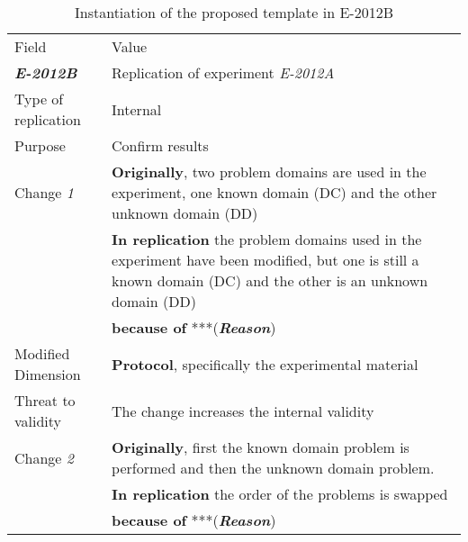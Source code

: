 \begin{table*}[h]
  \caption{Instantiation of the proposed template in E-2012B}
\label{tab:plantEng}
  \centering

\begin{tabularx}{\textwidth}{
  >{\hsize=0.3\hsize}X
  >{\hsize=0.8\hsize}X}
  
    \noalign{\smallskip}\hline\noalign{\smallskip}
  
  Field &  Value  \\ 
  \noalign{\smallskip}\hline\noalign{\smallskip}
  
\textbf {\textit{E-2012B}} &  Replication of experiment \textit{E-2012A }    \\
Type of replication &  Internal   \\  
Purpose  &  Confirm results \\   \hline

    Change \textit{1}   & \textbf{Originally}, two problem domains are used in the experiment, one known domain (DC) and the other unknown domain (DD) \\& \textbf{In replication} the problem domains used in the experiment have been modified, but one is still a known domain (DC) and the other is an unknown domain (DD) \\& \textbf{because of} ***(\textbf{\textit{Reason}})\\
    
    Modified Dimension & 
   \textbf{Protocol}, specifically the experimental material  \\ 
    Threat to validity & The change increases the internal validity \\  \hline
  
    Change \textit{2}   & \textbf{Originally}, first the known domain problem is performed and then the unknown domain problem. \\& \textbf{In replication} the order of the problems is swapped \\& \textbf{because of} ***(\textbf{\textit{Reason}})\\ 


\end{tabularx}
\end{table*}
